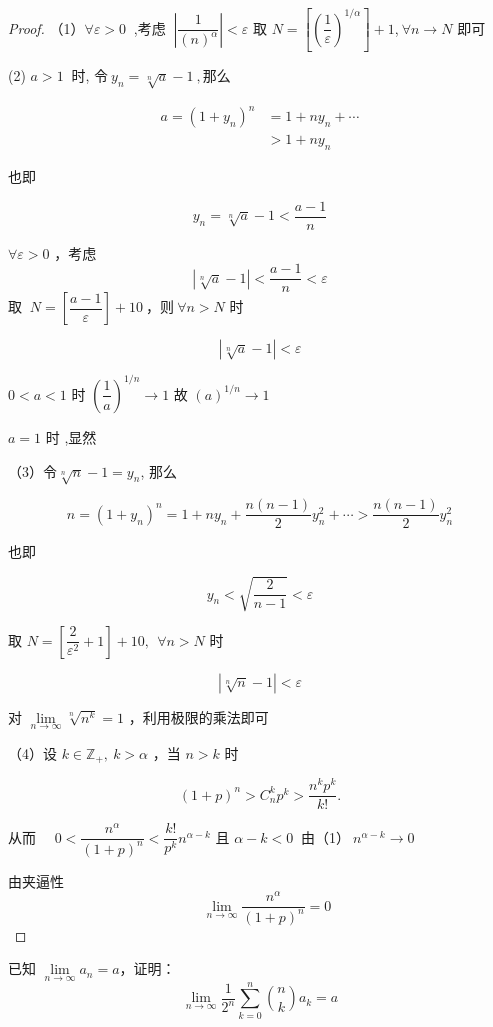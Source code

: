 \begin{proof}
	（1）$\forall \varepsilon>0~$ ,考虑 $~\left|\dfrac{1}{(n)^{\alpha}}\right|<\varepsilon$
	取 $N=\left[\left(\dfrac{1}{\varepsilon}\right)^{1 / \alpha}\right]+1 $,$~ \forall n \rightarrow N$ 即可
	
	(2) $a>1 ~$ 时, 令$~y_n= \sqrt[n]{a}-1~,$那么 
	
	$$
	\begin{aligned}
		a=\left(1+y_n\right)^n&=1+n y_n+\cdots \\
		&>1+n y_n
	\end{aligned}
	$$
	
	
	也即
	
	$$
	y_n=\sqrt[n]{a}-1<\frac{a-1}{n}
	$$
	
	$\forall \varepsilon>0$ ，考虑 $$|\sqrt[n]{a}-1|<\frac{a-1}{n}<\varepsilon$$
	取 $~N=\left[\dfrac{a-1}{\varepsilon}\right]+10 ~$，则$~ \forall n >N$ 时
	
	$$
	|\sqrt[n]{a}-1|<\varepsilon
	$$
	
	$0<a<1$ 时 $\left(\dfrac{1}{a}\right)^{1 / n} \rightarrow 1$ 故 $(a)^{1 / n} \rightarrow 1$
	
	$a=1$ 时 ,显然
	
	（3）令$\sqrt[n]{n}-1=y_n$, 那么
	
	$$
	n=\left(1+y_n\right)^n=1+n y_n+\dfrac{n(n-1)}{2} y_n^2+\cdots 
	>\dfrac{n(n-1)}{2} y_n^2$$
	
	
	也即
	
	$$
	y_n<\sqrt{\dfrac{2}{n-1}}<\varepsilon
	$$
	
	
	取 $N=\left[\dfrac{2}{\varepsilon^2}+1\right]+10, ~~ \forall n>N$ 时
	
	$$
	|\sqrt[n]{n}-1|<\varepsilon
	$$
	
	
	对 $\lim\limits_{n \rightarrow \infty} \sqrt[n]{n^k}=1$ ，利用极限的乘法即可
	
	（4）设 $k \in \mathbb{Z}_{+}, ~ k > \alpha$ ，当 $n>k$ 时
	
	$$
	(1+p)^n>C_n^k p^k>\dfrac{n^k p^k}{k!} .
	$$
	
	
	从而 $\quad 0<\dfrac{n^\alpha}{(1+p)^n}<\dfrac{k!}{p^k} n^{\alpha-k}$
	且 $\alpha-k<0 ~$ 由（1）$~ n^{\alpha-k} \rightarrow 0$
	
	由夹逼性 $$\quad \lim _{n \rightarrow \infty} \dfrac{n^\alpha}{(1+p)^n}=0$$
	
\end{proof}
\begin{example}
	已知 $\lim\limits_{n \to \infty} a_n = a$，证明：
	$$\lim\limits_{n\to\infty}\dfrac{1}{2^n}\sum_{k=0}^{n}{n \choose k}a_k=a$$
	
\end{example}

